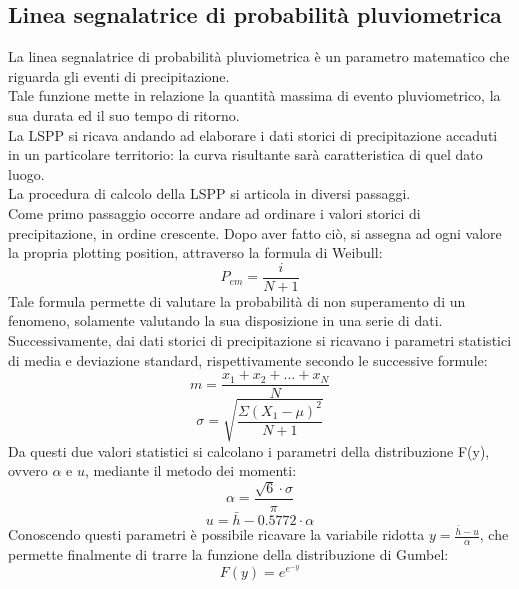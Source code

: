 \subsection{Linea segnalatrice di probabilità pluviometrica}
La linea segnalatrice di probabilità pluviometrica è un parametro matematico che riguarda gli eventi di precipitazione.\\
Tale funzione mette in relazione la quantità massima di evento pluviometrico, la sua durata ed il suo tempo di ritorno. \\
La LSPP si ricava andando ad elaborare i dati storici di precipitazione accaduti in un particolare territorio: la curva risultante sarà caratteristica di quel dato luogo.\\
La procedura di calcolo della LSPP si articola in diversi passaggi. \\
Come primo passaggio occorre andare ad ordinare i valori storici di precipitazione, in ordine crescente. Dopo aver fatto ciò, si assegna ad ogni valore la propria plotting position, attraverso la formula di Weibull:
\begin{equation}
\label{P_em}
    P_{em}=\frac{i}{N+1}
\end{equation}
Tale formula permette di valutare la probabilità di non superamento di un fenomeno, solamente valutando la sua disposizione in una serie di dati.\\
Successivamente, dai dati storici di precipitazione si ricavano i parametri statistici di media e deviazione standard, rispettivamente secondo le successive formule:
\begin{equation}
\label{media_aritmetica}
    m = \frac{x_1+x_2+...+x_N}{N}
\end{equation}
\begin{equation}
\label{dev.st}
    \sigma = \sqrt{\frac{\Sigma(X_1 - \mu)^2}{N+1}}
\end{equation}
Da questi due valori statistici si calcolano i parametri della distribuzione F(y), ovvero $\alpha$ e $u$, mediante il metodo dei momenti:
\begin{equation}
\label{alpha}
\alpha = \frac{\sqrt{6} \cdot \sigma}{\pi}    
\end{equation}
\begin{equation}
\label{u}
    u = \bar{h} - 0.5772 \cdot \alpha
\end{equation}
Conoscendo questi parametri è possibile ricavare la variabile ridotta $y = \frac{\bar{h}-u}{\alpha}$, che permette finalmente di trarre la funzione della distribuzione di Gumbel:
\begin{equation}
  F(y) = e^{e^{-y}}
\end{equation}
